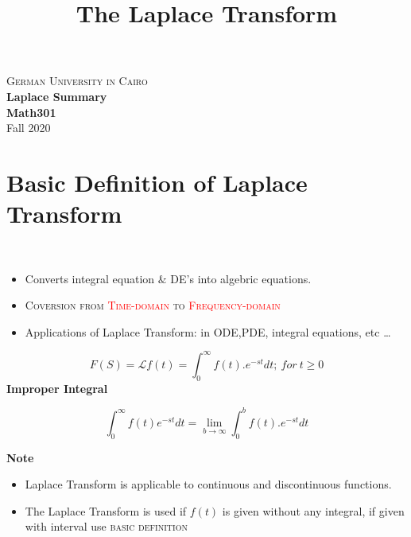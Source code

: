 \documentclass[11pt]{article}
\title{The Laplace Transform}
\theoremstyle{definition}
\newcommand{\bb}{\mathcal{L}}
\begin{document}
\thispagestyle{empty}
\begin{center}
    \textsc{\LARGE German University in Cairo}\\[1.0cm]
    {\LARGE \bf Laplace Summary}\\ [0.5cm]
    {\large \bf Math301}\\ [0.5cm]
    Fall 2020
\end{center}
\tableofcontents

\section{Basic Definition of Laplace Transform}
\\
\begin{itemize}
    \item Converts integral equation $\&$ DE's into algebric equations.
    \item  \textsc{Coversion from \textcolor{red}{Time-domain} to \textcolor{red}{Frequency-domain}}
    \item Applications of Laplace Transform: in ODE,PDE, integral equations, etc \dots    
\end{itemize}        
\begin{equation}
    F(S) = \bb{f(t)} = \int_0^\infty f(t).e^{-st}dt; \ for\  t\geq0
\end{equation}
\textbf{Improper Integral}

\begin{equation}
    \int_0^\infty f(t)e^{-st} dt = \displaystyle{\lim_{b \to \infty}} \int_0^b f(t).e^{-st} dt
\end{equation}    

\textbf{Note} \\ 

\begin{itemize}
    \item Laplace Transform is applicable to continuous and discontinuous functions.
    \item The Laplace Transform is used if $f(t)$ is given without any integral, if given with interval use \textsc{basic definition}
\end{itemize}
\end{document}
